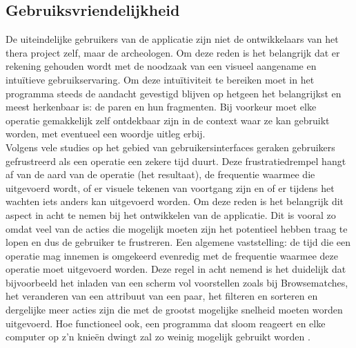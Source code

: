 \subsection{Gebruiksvriendelijkheid}
De uiteindelijke gebruikers van de applicatie zijn niet de ontwikkelaars van het thera project zelf, maar de archeologen. Om deze reden is het belangrijk dat er rekening gehouden wordt met de noodzaak van een visueel aangename en intu\"itieve gebruikservaring. Om deze intu\"itiviteit te bereiken moet in het programma steeds de aandacht gevestigd blijven op hetgeen het belangrijkst en meest herkenbaar is: de paren en hun fragmenten. Bij voorkeur moet elke operatie gemakkelijk zelf ontdekbaar zijn in de context waar ze kan gebruikt worden, met eventueel een woordje uitleg erbij.\\

Volgens vele studies op het gebied van gebruikersinterfaces \cite{Hoxmeier00,Shneiderman84,Nielsen94} geraken gebruikers gefrustreerd als een operatie een zekere tijd duurt. Deze frustratiedrempel hangt af van de aard van de operatie (het resultaat), de frequentie waarmee die uitgevoerd wordt, of er visuele tekenen van voortgang zijn en of er tijdens het wachten iets anders kan uitgevoerd worden. Om deze reden is het belangrijk dit aspect in acht te nemen bij het ontwikkelen van de applicatie. Dit is vooral zo omdat veel van de acties die mogelijk moeten zijn het potentieel hebben traag te lopen en dus de gebruiker te frustreren. Een algemene vaststelling: de tijd die een operatie mag innemen is omgekeerd evenredig met de frequentie waarmee deze operatie moet uitgevoerd worden. Deze regel in acht nemend is het duidelijk dat bijvoorbeeld het inladen van een scherm vol voorstellen zoals bij Browsematches, het veranderen van een attribuut van een paar, het filteren en sorteren en dergelijke meer acties zijn die met de grootst mogelijke snelheid moeten worden uitgevoerd. Hoe functioneel ook, een programma dat sloom reageert en elke computer op z'n knie\"en dwingt zal zo weinig mogelijk gebruikt worden \cite{Joel2001}.\\



